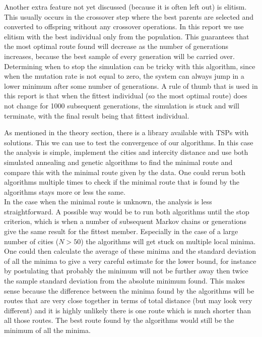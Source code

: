 \documentclass[10pt,a4paper]{article}
\begin{document}
Another extra feature not yet discussed (because it is often left out) is elitism. This usually occurs in the crossover step where the best parents are selected and converted to offspring without any crossover operations. In this report we use elitism with the best individual only from the population. This guarantees that the most optimal route found will decrease as the number of generations increases, because the best sample of every generation will be carried over.\\
Determining when to stop the simulation can be tricky with this algorithm, since when the mutation rate is not equal to zero, the system can always jump in a lower minimum after some number of generations. A rule of thumb that is used in this report is that when the fittest individual (so the most optimal route) does not change for 1000 subsequent generations, the simulation is stuck and will terminate, with the final result being that fittest individual.

As mentioned in the theory section, there is a library available with TSPs with solutions. This we can use to test the convergence of our algorithms. In this case the analysis is simple, implement the cities and intercity distance and use both simulated annealing and genetic algorithms to find the minimal route and compare this with the minimal route given by the data. One could rerun both algorithms multiple times to check if the minimal route that is found by the algorithms stays more or less the same.\\
In the case when the minimal route is unknown, the analysis is less straightforward. A possible way would be to run both algorithms until the stop criterion, which is when a number of subsequent Markov chains or generations give the same result for the fittest member. Especially in the case of a large number of cities ($N > 50$) the algorithms will get stuck on multiple local minima. One could then calculate the average of these minima and the standard deviation of all the minima to give a very careful estimate for the lower bound, for instance by postulating that probably the minimum will not be further away then twice the sample standard deviation from the absolute minimum found. This makes sense because the difference between the minima found by the algorithms will be routes that are very close together in terms of total distance (but may look very different) and it is highly unlikely there is one route which is much shorter than all those routes. The best route found by the algorithms would still be the minimum of all the minima.
\end{document}
